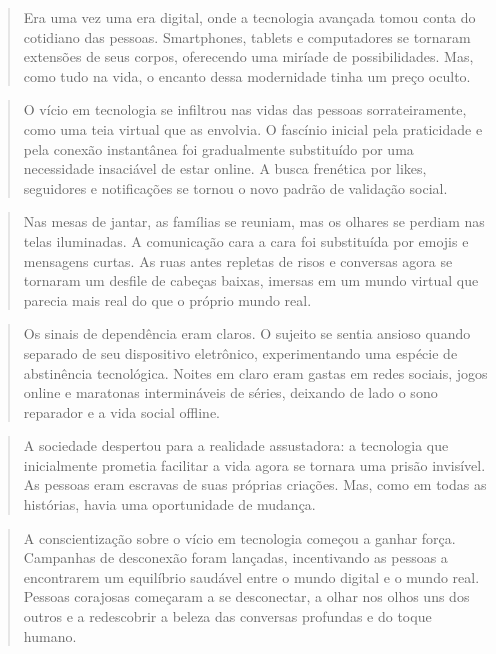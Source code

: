 \begin{quote}
Era uma vez uma era digital, onde a tecnologia avançada tomou conta do
cotidiano das pessoas. Smartphones, tablets e computadores se tornaram
extensões de seus corpos, oferecendo uma miríade de possibilidades. Mas,
como tudo na vida, o encanto dessa modernidade tinha um preço oculto.
\end{quote}

\begin{quote}
O vício em tecnologia se infiltrou nas vidas das pessoas
sorrateiramente, como uma teia virtual que as envolvia. O fascínio
inicial pela praticidade e pela conexão instantânea foi gradualmente
substituído por uma necessidade insaciável de estar online. A busca
frenética por likes, seguidores e notificações se tornou o novo padrão
de validação social.
\end{quote}

\begin{quote}
Nas mesas de jantar, as famílias se reuniam, mas os olhares se perdiam
nas telas iluminadas. A comunicação cara a cara foi substituída por
emojis e mensagens curtas. As ruas antes repletas de risos e conversas
agora se tornaram um desfile de cabeças baixas, imersas em um mundo
virtual que parecia mais real do que o próprio mundo real.
\end{quote}

\begin{quote}
Os sinais de dependência eram claros. O sujeito se sentia ansioso quando
separado de seu dispositivo eletrônico, experimentando uma espécie de
abstinência tecnológica. Noites em claro eram gastas em redes sociais,
jogos online e maratonas intermináveis de séries, deixando de lado o
sono reparador e a vida social offline.
\end{quote}

\begin{quote}
A sociedade despertou para a realidade assustadora: a tecnologia que
inicialmente prometia facilitar a vida agora se tornara uma prisão
invisível. As pessoas eram escravas de suas próprias criações. Mas, como
em todas as histórias, havia uma oportunidade de mudança.
\end{quote}

\begin{quote}
A conscientização sobre o vício em tecnologia começou a ganhar força.
Campanhas de desconexão foram lançadas, incentivando as pessoas a
encontrarem um equilíbrio saudável entre o mundo digital e o mundo real.
Pessoas corajosas começaram a se desconectar, a olhar nos olhos uns dos
outros e a redescobrir a beleza das conversas profundas e do toque
humano.
\end{quote}

